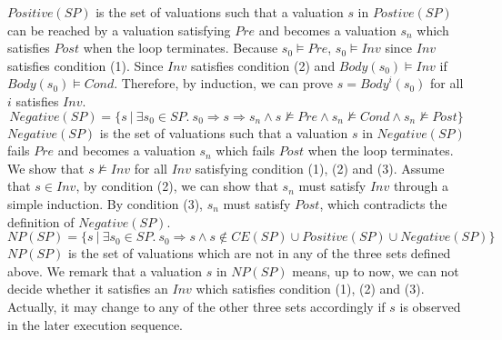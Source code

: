$\mathit{Positive}(\mathit{SP})$ is the set of valuations such that a valuation $s$ in $\mathit{Postive}(\mathit{SP})$ can be reached by a valuation satisfying $Pre$ and becomes a valuation $s_n$ which satisfies $Post$ when the loop terminates. 
Because $s_0 \models \mathit{Pre}$, $s_0 \models \mathit{Inv}$ since $\mathit{Inv}$ satisfies condition (1). 
Since $\mathit{Inv}$ satisfies condition (2) and $\mathit{Body}(s_0) \models \mathit{Inv}$ if $\mathit{Body}(s_0) \models \mathit{Cond}$.
Therefore, by induction, we can prove $s = \mathit{Body}^i(s_0)$ for all $i$ satisfies $\mathit{Inv}$.
 \[
    \mathit{Negative}(\mathit{SP}) = \{s~|~\exists s_0 \in \mathit{SP}.~s_0 \Rightarrow s \Rightarrow s_n \land s \not \models \mathit{Pre} \land s_n \not \models \mathit{Cond} \land s_n \not \models \mathit{Post}\} \]
$\mathit{Negative}(\mathit{SP})$ is the set of valuations such that a valuation $s$ in $\mathit{Negative}(\mathit{SP})$ fails $\mathit{Pre}$ and becomes a valuation $s_n$ which fails $\mathit{Post}$ when the loop terminates. We show that $s \not \models \mathit{Inv}$ for all $\mathit{Inv}$ satisfying condition (1), (2) and (3). Assume that $s \in \mathit{Inv}$, by condition (2), we can show that $s_n$ must satisfy $\mathit{Inv}$ through a simple induction. By condition (3), $s_n$ must satisfy $\mathit{Post}$, which contradicts the definition of $\mathit{Negative}(\mathit{SP})$.
\[    \mathit{NP}(\mathit{SP}) = \{s~|~\exists s_0 \in \mathit{SP}.~ s_0 \Rightarrow s \land s \not \in \mathit{CE(SP)} \cup \mathit{Positive(SP)} \cup \mathit{Negative(SP)}\}
\]
$\mathit{NP(SP)}$ is the set of valuations which are not in any of the three sets defined above. 
We remark that a valuation $s$ in $\mathit{NP(SP)}$ means, up to now, we can not decide whether it satisfies an $\mathit{Inv}$ which satisfies condition (1), (2) and (3).
Actually, it may change to any of the other three sets accordingly if $s$ is observed in the later execution sequence.

